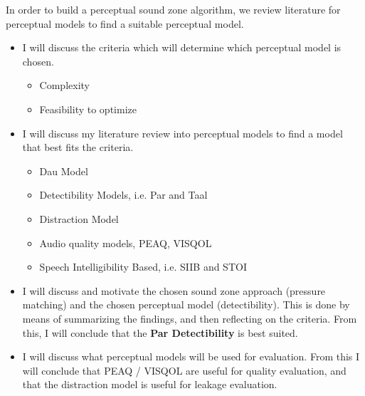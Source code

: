 In order to build a perceptual sound zone algorithm, we review literature for perceptual models to find a suitable perceptual model.
\begin{itemize}
    \item I will discuss the criteria which will determine which perceptual model is chosen.
        \begin{itemize}
            \item Complexity
            \item Feasibility to optimize
        \end{itemize}
    \item I will discuss my literature review into perceptual models to find a model that best fits the criteria.
        \begin{itemize}
            \item Dau Model
            \item Detectibility Models, i.e. Par and Taal
            \item Distraction Model
            \item Audio quality models, PEAQ, VISQOL
            \item Speech Intelligibility Based, i.e. SIIB and STOI
        \end{itemize}
    \item I will discuss and motivate the chosen sound zone approach (pressure matching) and the chosen perceptual model (detectibility).
        This is done by means of summarizing the findings, and then reflecting on the criteria.
        From this, I will conclude that the \textbf{Par Detectibility} is best suited.
    \item I will discuss what perceptual models will be used for evaluation.
        From this I will conclude that PEAQ / VISQOL are useful for quality evaluation, and that the distraction model is useful for leakage evaluation.
\end{itemize}
